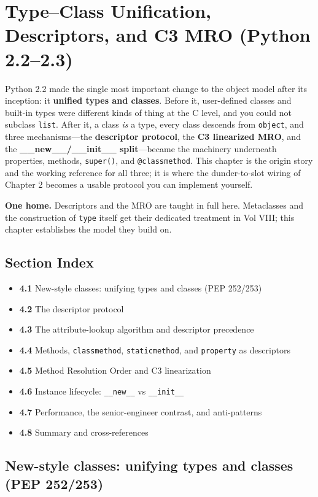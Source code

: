 \chapter{Type--Class Unification, Descriptors, and C3 MRO (Python 2.2--2.3)}

Python 2.2 made the single most important change to the object model after its inception: it
\textbf{unified types and classes}. Before it, user-defined classes and built-in types were
different kinds of thing at the C level, and you could not subclass \texttt{list}. After it, a
class \emph{is} a type, every class descends from \texttt{object}, and three mechanisms---the
\textbf{descriptor protocol}, the \textbf{C3 linearized MRO}, and the
\textbf{\_\_new\_\_/\_\_init\_\_ split}---became the machinery underneath properties, methods,
\texttt{super()}, and \texttt{@classmethod}. This chapter is the origin story and the working
reference for all three; it is where the dunder-to-slot wiring of Chapter 2 becomes a usable
protocol you can implement yourself.

\textbf{One home.} Descriptors and the MRO are taught in full here. Metaclasses and the
construction of \texttt{type} itself get their dedicated treatment in Vol VIII; this chapter
establishes the model they build on.

\section*{Section Index}
\begin{itemize}
  \item \textbf{4.1} New-style classes: unifying types and classes (PEP 252/253)
  \item \textbf{4.2} The descriptor protocol
  \item \textbf{4.3} The attribute-lookup algorithm and descriptor precedence
  \item \textbf{4.4} Methods, \texttt{classmethod}, \texttt{staticmethod}, and \texttt{property} as descriptors
  \item \textbf{4.5} Method Resolution Order and C3 linearization
  \item \textbf{4.6} Instance lifecycle: \texttt{\_\_new\_\_} vs \texttt{\_\_init\_\_}
  \item \textbf{4.7} Performance, the senior-engineer contrast, and anti-patterns
  \item \textbf{4.8} Summary and cross-references
\end{itemize}

\section{New-style classes: unifying types and classes (PEP 252/253)}

